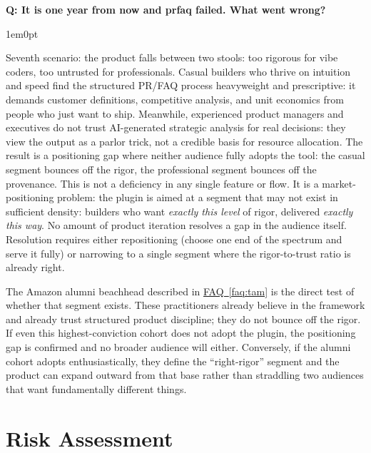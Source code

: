 \documentclass[11pt,letterpaper]{article}
\newcounter{faqnum}
\newenvironment{faqpair}[1]{%
  \needspace{4\baselineskip}%
  \vspace{0.5em}%
  \refstepcounter{faqnum}%
  \noindent\textbf{\color{SectionBlue}Q\thefaqnum: #1}\par\nopagebreak[4]%
  \vspace{0.2em}%
  \begin{adjustwidth}{1em}{0pt}%
  \setlength{\parindent}{0pt}%
}{%
  \end{adjustwidth}%
  \vspace{0.5em}%
}
\newcommand{\faqref}[1]{\hyperref[#1]{FAQ~\ref*{#1}}}
\begin{document}
\begin{faqpair}{It is one year from now and prfaq failed. What went wrong?}
  Seventh scenario: the product falls between two stools: too rigorous for vibe coders, too untrusted for professionals. Casual builders who thrive on intuition and speed find the structured PR/FAQ process heavyweight and prescriptive: it demands customer definitions, competitive analysis, and unit economics from people who just want to ship. Meanwhile, experienced product managers and executives do not trust AI-generated strategic analysis for real decisions: they view the output as a parlor trick, not a credible basis for resource allocation. The result is a positioning gap where neither audience fully adopts the tool: the casual segment bounces off the rigor, the professional segment bounces off the provenance. This is not a deficiency in any single feature or flow. It is a market-positioning problem: the plugin is aimed at a segment that may not exist in sufficient density: builders who want \textit{exactly this level} of rigor, delivered \textit{exactly this way}. No amount of product iteration resolves a gap in the audience itself. Resolution requires either repositioning (choose one end of the spectrum and serve it fully) or narrowing to a single segment where the rigor-to-trust ratio is already right.

  The Amazon alumni beachhead described in \faqref{faq:tam} is the direct test of whether that segment exists. These practitioners already believe in the framework and already trust structured product discipline; they do not bounce off the rigor. If even this highest-conviction cohort does not adopt the plugin, the positioning gap is confirmed and no broader audience will either. Conversely, if the alumni cohort adopts enthusiastically, they define the ``right-rigor'' segment and the product can expand outward from that base rather than straddling two audiences that want fundamentally different things.
\end{faqpair}


\newpage
\section*{Risk Assessment}
\end{document}

